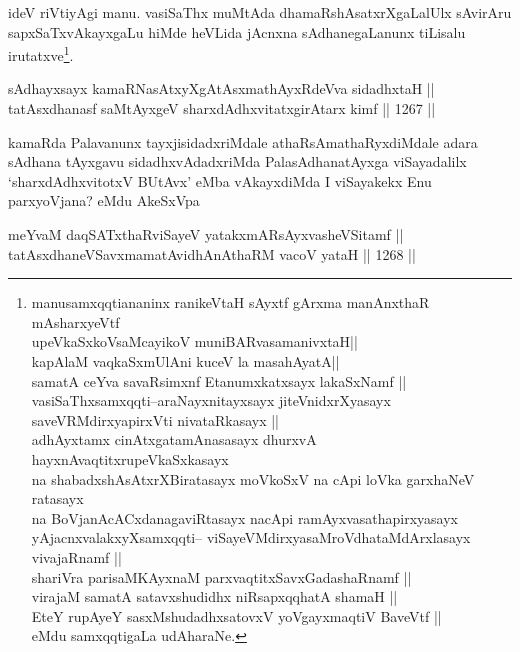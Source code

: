 \begin{artha}
ideV riVtiyAgi manu. vasiSaThx muMtAda dhamaRshAsatxrXgaLalUlx sAvirAru sapxSaTxvAkayxgaLu hiMde heVLida jAcnxna sAdhanegaLanunx tiLisalu irutatxve\footnote{manusamxqqtiananinx ranikeVtaH sAyxtf gArxma manAnxthaR mAsharxyeVtf\\
upeVkaSxkoV\s saMcayikoV muniBARvasamanivxtaH||\\
kapAlaM vaqkaSxmUlAni kuceV la masahAyatA||\\
samatA ceYva savaRsimxnf Etanumxkatxsayx lakaSxNamf ||\\ vasiSaThxsamxqqti{\rm --}araNayxnitayxsayx jiteVnidxrXyasayx saveVRMdirxyapirxVti nivataRkasayx ||\\
adhAyxtamx cinAtxgatamAnasasayx dhurxvA hayxnAvaqtitxrupeVkaSxkasayx \\
na shabadxshAsAtxrXBiratasayx moVkoSxV na cApi loVka garxhaNeV ratasayx\\
na BoVjanAcACxdanagaviRtasayx nacApi ramAyxvasathapirxyasayx \\ yAjacnxvalakxyXsamxqqti{\rm --} viSayeVMdirxyasaMroVdhataMdArxlasayx vivajaRnamf ||\\
shariVra parisaMKAyxnaM parxvaqtitxSavxGadashaRnamf ||\\
virajaM samatA satavxshudidhx niRsapxqqhatA shamaH ||\\
EteY rupAyeY sasxMshudadhxsatovxV yoVgayxmaqtiV BaveVtf ||\\ eMdu samxqqtigaLa udAharaNe.}.
\end{artha}


\begin{shl}
sAdhayxsayx kamaRNasAtxyXgAtAsxmathAyxRdeVva sidadhxtaH || \\
tatAsxdhanasf saMtAyxgeV sharxdAdhxvitatxgirA\s tarx kimf \hfill || 1267 || 
\end{shl}

\begin{artha}
kamaRda Palavanunx tayxjisidadxriMdale athaRsAmathaRyxdiMdale adara sAdhana tAyxgavu sidadhxvAdadxriMda PalasAdhanatAyxga viSayadalilx `sharxdAdhxvitotxV BUtAvx' eMba vAkayxdiMda I viSayakekx Enu parxyoVjana? eMdu AkeSxVpa
\end{artha}

\begin{shl}
meYvaM daqSATxthaRviSayeV yatakxmARsAyxvasheVSitamf || \\
tatAsxdhaneVSavxmamatAvidhAnAthaRM vacoV yataH \hfill || 1268 ||  
\end{shl}

